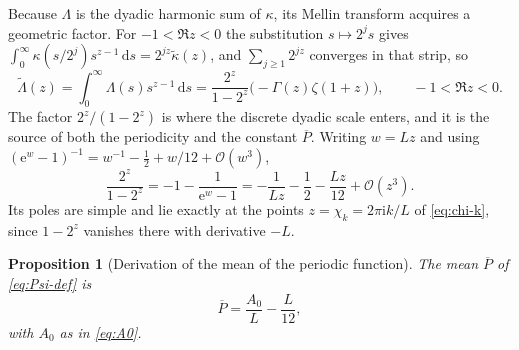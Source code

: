 \documentclass[11pt,oneside]{article}
\newtheorem{proposition}[theorem]{Proposition}
\theoremstyle{definition}
\theoremstyle{remark}
\newcommand{\e}{\mathrm e}
\newcommand{\ii}{\mathrm i}
\newcommand{\dd}{\,\mathrm d}
\newcommand{\bigO}{\mathcal O}
\begin{document}
Because $\Lambda$ is the dyadic harmonic sum of $\kappa$, its Mellin transform acquires a
geometric factor.  For $-1<\Re z<0$ the substitution $s\mapsto2^{j}s$ gives
$\int_0^\infty\kappa(s/2^{j})s^{z-1}\dd s=2^{jz}\widetilde\kappa(z)$, and
$\sum_{j\ge1}2^{jz}$ converges in that strip, so
\begin{equation}
 \widetilde\Lambda(z)=\int_0^{\infty}\Lambda(s)s^{z-1}\dd s
 =\frac{2^{z}}{1-2^{z}}\bigl(-\Gamma(z)\zeta(1+z)\bigr),
 \qquad -1<\Re z<0.                                       \label{eq:as-mellin-Lambda}
\end{equation}
The factor $2^{z}/(1-2^{z})$ is where the discrete dyadic scale enters, and it is the source
of both the periodicity and the constant $\overline P$.  Writing $w=Lz$ and using
$(\e^{w}-1)^{-1}=w^{-1}-\tfrac12+w/12+\bigO(w^{3})$,
\begin{equation}
 \frac{2^{z}}{1-2^{z}}=-1-\frac1{\e^{w}-1}
 =-\frac1{Lz}-\frac12-\frac{Lz}{12}+\bigO(z^{3}).         \label{eq:as-geometric-laurent}
\end{equation}
Its poles are simple and lie exactly at the points $z=\chi_k=2\pi\ii k/L$ of
\eqref{eq:chi-k}, since $1-2^{z}$ vanishes there with derivative $-L$.

\begin{proposition}[Derivation of the mean of the periodic function]
\label{prop:as-mean-derivation}
The mean $\overline P$ of \eqref{eq:Psi-def} is
\begin{equation}
 \overline P=\frac{A_0}{L}-\frac{L}{12},                   \label{eq:as-P-mean-derived}
\end{equation}
with $A_0$ as in \eqref{eq:A0}.
\end{proposition}
\end{document}
